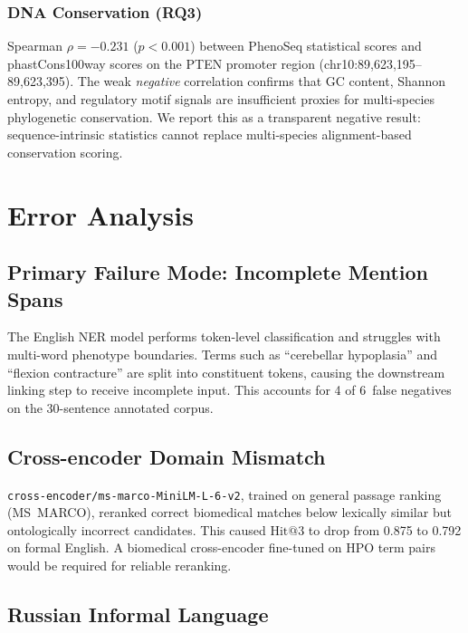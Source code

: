 \documentclass[11pt,a4paper]{article}
\begin{document}
\subsubsection*{DNA Conservation (RQ3)}
\label{sec:rq3}

Spearman $\rho = -0.231$ ($p < 0.001$) between PhenoSeq statistical scores
and phastCons100way scores on the PTEN promoter region
(chr10:89{,}623{,}195--89{,}623{,}395).  The weak \emph{negative} correlation
confirms that GC content, Shannon entropy, and regulatory motif signals are
insufficient proxies for multi-species phylogenetic conservation.  We report
this as a transparent negative result: sequence-intrinsic statistics cannot
replace multi-species alignment-based conservation scoring.

\section{Error Analysis}
\label{sec:error}

\subsection{Primary Failure Mode: Incomplete Mention Spans}

The English NER model performs token-level classification and struggles with
multi-word phenotype boundaries.  Terms such as ``cerebellar hypoplasia'' and
``flexion contracture'' are split into constituent tokens, causing the
downstream linking step to receive incomplete input.  This accounts for 4 of
6~false negatives on the 30-sentence annotated corpus.

\subsection{Cross-encoder Domain Mismatch}

\texttt{cross-encoder/ms-marco-MiniLM-L-6-v2}, trained on general passage
ranking (MS~MARCO), reranked correct biomedical matches below lexically similar
but ontologically incorrect candidates.  This caused $\text{Hit@3}$ to drop
from 0.875 to 0.792 on formal English.  A biomedical cross-encoder fine-tuned
on HPO term pairs would be required for reliable reranking.

\subsection{Russian Informal Language}
\end{document}
